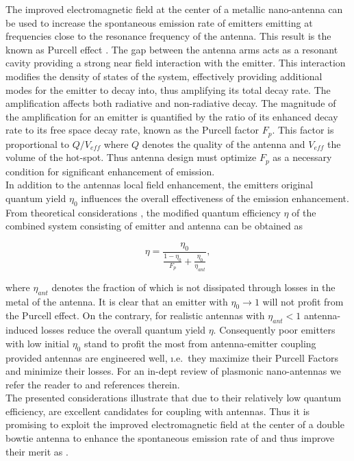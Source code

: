 		The improved electromagnetic field at the center of a metallic nano-antenna can be used to increase the spontaneous emission rate of emitters emitting at frequencies close to the resonance frequency of the antenna. This result is the known as Purcell effect \cite{nancy::86}. The gap between the antenna arms acts as a resonant cavity providing a strong near field interaction with the emitter. This interaction modifies the density of states of the system, effectively providing additional modes for the emitter to decay into, thus amplifying its total decay rate. The amplification affects both radiative and non-radiative decay.
		The magnitude of the amplification for an emitter is quantified by the ratio of its enhanced decay rate to its free space decay rate, known as the Purcell factor $F_p$. This factor is proportional to $Q/V_{eff}$ where $Q$ denotes the quality of the antenna and $V_{eff}$ the volume of the hot-spot. Thus antenna design must optimize $F_p$ as a necessary condition for significant enhancement of \fl emission.
		\\
		In addition to the antennas local field enhancement, the emitters original quantum yield $\eta_0$ influences the overall effectiveness of the emission enhancement. From theoretical considerations \cite{rahbany2016towards, nancy::140, nancy::162, nancy::163}, the modified quantum efficiency $\eta$ of the combined system consisting of emitter and antenna can be obtained as

		\begin{equation}
			\eta = \frac{\eta_0}{\frac{1-\eta_0}{F_p} + \frac{\eta_0}{\eta_{ant}} },
		\end{equation}

		where $\eta_{ant}$ denotes the fraction of \fl which is not dissipated through losses in the metal of the antenna. It is clear that an emitter with $\eta_0 \to 1$ will not profit from the Purcell effect. On the contrary, for realistic antennas with $\eta_{ant} < 1$ antenna-induced losses reduce the overall quantum yield $\eta$. Consequently poor emitters with low initial $\eta_{0}$ stand to profit the most from antenna-emitter coupling provided antennas are engineered well, \i.e.\ they maximize their Purcell Factors and minimize their losses. For an in-dept review of plasmonic nano-antennas we refer the reader to \cite{rahbany2016towards} and references therein.
		\\
		The presented considerations illustrate that due to their relatively low quantum efficiency, \sivs are excellent candidates for coupling with antennas. Thus it is promising to exploit the improved electromagnetic field at the center of a double bowtie antenna to enhance the spontaneous emission rate of \sivs and thus improve their merit as \spss.

